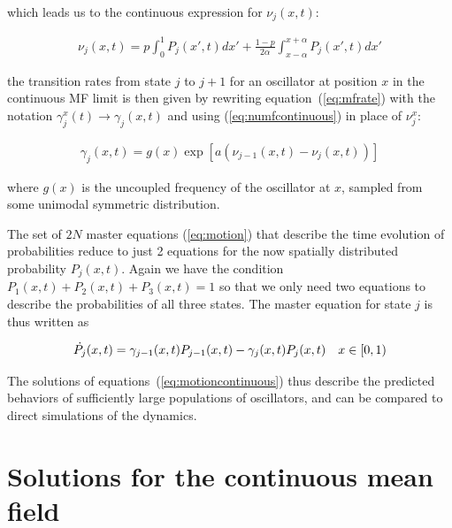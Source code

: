 \noindent which leads us to the continuous expression for $\nu_j(x,t)$:

\begin{align}
    \nu_j(x,t) = p \int_0^1 P_j(x',t)dx' + \frac{1-p}{2\alpha}\int_{x-\alpha}^{x+\alpha} P_j(x',t)dx'
    \label{eq:numfcontinuous}
\end{align}

\noindent the transition rates from state $j$ to $j+1$ for an oscillator at position $x$ in the continuous MF limit is then given by
rewriting equation~(\ref{eq:mfrate}) with the notation $\gamma^x_j(t) \to \gamma_j(x,t)$ and using (\ref{eq:numfcontinuous}) in place
of $\nu^x_j$:

\begin{align}
    \gamma_j(x,t) = g(x) \exp\left[ a\left( \nu_{j-1}(x,t) - \nu_j(x,t) \right) \right]
    \label{eq:ratecontinuous}
\end{align}

\noindent where $g(x)$ is the uncoupled frequency of the oscillator at $x$, sampled from some unimodal symmetric distribution.

The set of $2N$ master equations (\ref{eq:motion}) that describe the time evolution of probabilities reduce to just 2 equations for the
now spatially distributed probability $P_j(x,t)$. Again we have the condition $P_1(x,t) + P_2(x,t) + P_3(x,t)=1$ so that we only need
two equations to describe the probabilities of all three states. The master equation for state $j$ is thus written as

\begin{align}
    \dot{P_j}(x,t) &= \gamma_{j-1}(x,t)P_{j-1}(x,t) - \gamma_j(x,t)P_j(x,t) & x\in[0,1)
    \label{eq:motioncontinuous}
\end{align}

The solutions of equations~(\ref{eq:motioncontinuous}) thus describe the predicted behaviors of sufficiently large populations of
oscillators, and can be compared to direct simulations of the dynamics.

\section{Solutions for the continuous mean field}


